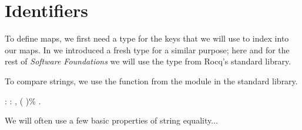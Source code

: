 \documentclass[12pt]{report}
\begin{document}
\section{Identifiers}



 To define maps, we first need a type for the keys that we will use
    to index into our maps.  In  we introduced a fresh type
     for a similar purpose; here and for the rest of \textit{Software
    Foundations} we will use the  type from Rocq's standard
    library. 

 To compare strings, we use the function  from the 
    module in the standard library. 
\begin{coqdoccode}
\coqdocemptyline
\coqdocnoindent
{}  :\coqdoceol
\coqdocindent{1.00em}
\coqdockw{\ensuremath{\forall}}  : , (  )\%  .\coqdoceol
\coqdocemptyline
\end{coqdoccode}
We will often use a few basic properties of string equality... 
\end{document}
